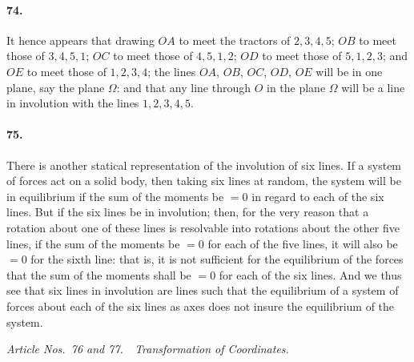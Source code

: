 \documentclass[11pt,a4paper]{article}
\begin{document}
\paragraph{74.}
It hence appears that drawing $OA$ to meet the tractors of $2, 3, 4, 5$;
$OB$ to meet those of $3, 4, 5, 1$; $OC$ to meet those of $4, 5, 1, 2$; $OD$ to meet those of
$5, 1, 2, 3$; and $OE$ to meet those of $1, 2, 3, 4$; the lines $OA$, $OB$, $OC$, $OD$, $OE$ will
be in one plane, say the plane $\Omega$: and that any line through $O$ in the plane $\Omega$
will be a line in involution with the lines $1, 2, 3, 4, 5$.

\paragraph{75.}
There is another statical representation of the involution of six lines. If a
system of forces act on a solid body, then taking six lines at random, the system
will be in equilibrium if the sum of the moments be $= 0$ in regard to each of the
six lines. But if the six lines be in involution; then, for the very reason that a
rotation about one of these lines is resolvable into rotations about the other five
lines, if the sum of the moments be $= 0$ for each of the five lines, it will also be
$= 0$ for the sixth line: that is, it is not sufficient for the equilibrium of the forces
that the sum of the moments shall be $= 0$ for each of the six lines. And we thus
see that six lines in involution are lines such that the equilibrium of a system of
forces about each of the six lines as axes does not insure the equilibrium of the
system.

\bigskip
\begin{center}
\textit{Article Nos.\ 76 and 77.\ \ Transformation of Coordinates.}
\end{center}
\end{document}
